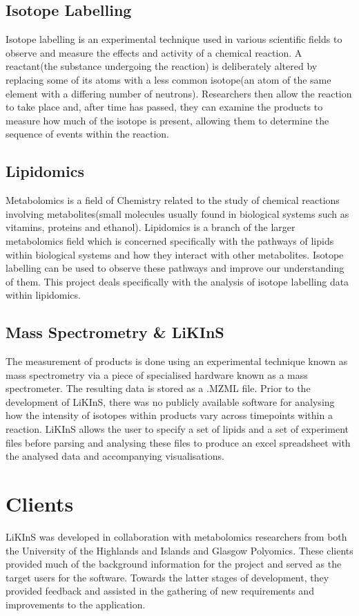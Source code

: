 \documentclass{l4proj}
\begin{document}
\subsection{Isotope Labelling}
Isotope labelling is an experimental technique used in various scientific fields to observe and measure the effects and activity of a chemical reaction. A reactant(the substance undergoing the reaction) is deliberately altered by replacing some of its atoms with a less common isotope(an atom of the same element with a differing number of neutrons). Researchers then allow the reaction to take place and, after time has passed, they can examine the products to measure how much of the isotope is present, allowing them to determine the sequence of events within the reaction. 

\subsection{Lipidomics}
Metabolomics is a field of Chemistry related to the study of chemical reactions involving metabolites(small molecules usually found in biological systems such as vitamins, proteins and ethanol). Lipidomics is a branch of the larger metabolomics field which is concerned specifically with the pathways of lipids within biological systems and how they interact with other metabolites. Isotope labelling can be used to observe these pathways and improve our understanding of them. This project deals specifically with the analysis of isotope labelling data within lipidomics.

\subsection{Mass Spectrometry \& LiKInS}
The measurement of products is done using an experimental technique known as mass spectrometry via a piece of specialised hardware known as a mass spectrometer. The resulting data is stored as a .MZML file. Prior to the development of LiKInS, there was no publicly available software for analysing how the intensity of isotopes within products vary across timepoints within a reaction. LiKInS allows the user to specify a set of lipids and a set of experiment files before parsing and analysing these files to produce an excel spreadsheet with the analysed data and accompanying visualisations.


\section{Clients}
LiKInS was developed in collaboration with metabolomics researchers from both the University of the Highlands and Islands and Glasgow Polyomics. These clients provided much of the background information for the project and served as the target users for the software. Towards the latter stages of development, they provided feedback and assisted in the gathering of new requirements and improvements to the application.
\end{document}
